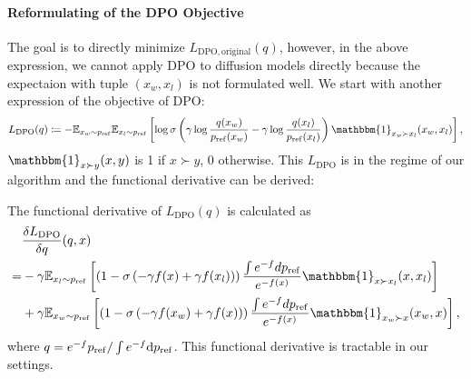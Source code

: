\paragraph{Reformulating of the DPO Objective}
The goal is to directly minimize $L_{\mathrm{DPO,original}}(q)$, however, in  the above expression, we cannot apply DPO to diffusion models directly because the expectaion with tuple $(x_w,x_l)$ is not formulated well. We start with another expression of the objective of DPO:
\begin{equation}
    L_{\mathrm{DPO}}(q) \coloneq - \E_{x_w\sim p_{\mathrm{ref}}}\E_{x_l\sim p_{\mathrm{ref}}}
    \left[ 
         \log \sigma \left(\gamma \log \frac{q(x_w)}{\pref(x_w)}- \gamma \log \frac{q(x_l)}{\pref(x_l)}\right)\mathbbm{1}_{x_w \succ x_l}(x_w,x_l)
    \right],
\end{equation}
$\mathbbm{1}_{x \succ y}(x,y)$ is 1 if $x \succ y$, 0 otherwise.
This $L_\mathrm{DPO}$ is in the regime of our algorithm and the functional derivative can be derived:
\begin{prop}
    The functional derivative of $L_\mathrm{DPO}(q)$ is calculated as
    \begin{align}
    &\frac{\delta L_\mathrm{DPO}}{\delta q}(q,x) \\
    =&
    -\gamma\E_{x_l\sim p_{\mathrm{ref}}}
    \left[
        \left(
            1- \sigma
            \left(
               - \gamma f(x) + \gamma f(x_l)
            \right)
        \right)
        \frac{\int e^{-f} dp_\mathrm{ref}}{e^{-f(x)}}
        \mathbbm{1}_{x \succ x_l}(x,x_l)
    \right]\\
    &+     \gamma\E_{x_w\sim p_{\mathrm{ref}}}
    \left[
        \left(
            1- \sigma
            \left(
                - \gamma f(x_w)
                + \gamma f(x)
            \right)
        \right)
        \frac{\int e^{-f} dp_\mathrm{ref}}{e^{-f(x)}}
        \mathbbm{1}_{x_w \succ x}(x_w,x)
    \right],
    \end{align}
    where $q = e^{-f}p_{\rm{ref}} / \int e^{-f}\mathrm{d}p_{\rm{ref}}$. This functional derivative is tractable in our settings.
\end{prop}

